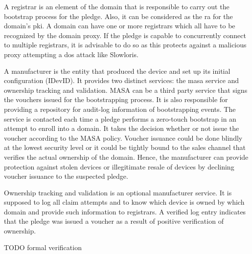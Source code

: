 \par
A registrar is an element of the domain that is responsible to carry out the bootstrap process for the pledge. Also, it can be considered as the \gls{ra} for the domain's \gls{pki}. A domain can have one or more registrars which all have to be recognized by the domain proxy. If the pledge is capable to concurrently connect to multiple registrars, it is advisable to do so as this protects against a malicious proxy attempting a \gls{dos} attack like Slowloris.
\par
A manufacturer is the entity that produced the device and set up its initial configuration (IDevID). It provides two distinct services: the \gls{masa} service and ownership tracking and validation.
MASA can be a third party service that signs the vouchers issued for the bootstrapping process. It is also responsible for providing a repository for audit-log information of bootstrapping events. The service is contacted each time a pledge performs a zero-touch bootstrap in an attempt to enroll into a domain. It takes the decision whether or not issue the voucher according to the MASA policy. Voucher issuance could be done blindly at the lowest security level or it could be tightly bound to the sales channel that verifies the actual ownership of the domain. Hence, the manufacturer can provide protection against stolen devices or illegitimate resale of devices by declining voucher issuance to the suspected pledge.
\par
Ownership tracking and validation is an optional manufacturer service. It is supposed to log all claim attempts and to know which device is owned by which domain and provide such information to registrars.  A verified log entry indicates that the pledge was issued a voucher as a result of positive verification of ownership.
\par
TODO formal verification